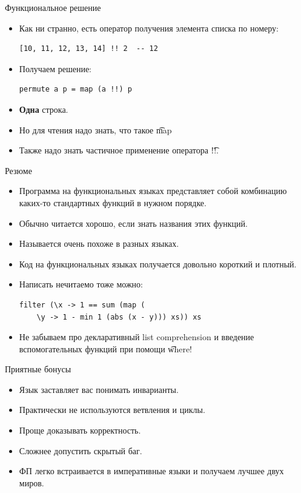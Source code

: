 \begin{frame}[fragile]{Функциональное решение}
	\begin{itemize}
		\item Как ни странно, есть оператор получения элемента списка по номеру:
\begin{verbatim}
[10, 11, 12, 13, 14] !! 2  -- 12
\end{verbatim}
		\item Получаем решение:
\begin{verbatim}
permute a p = map (a !!) p
\end{verbatim}
		\item \textbf{Одна} строка.
		\item Но для чтения надо знать, что такое \t{map}
		\item Также надо знать частичное применение оператора \t{!!}.
	\end{itemize}
\end{frame}

\begin{frame}[fragile]{Резюме}
	\begin{itemize}
		\item Программа на функциональных языках представляет собой комбинацию каких-то стандартных функций в нужном порядке.
		\item Обычно читается хорошо, если знать названия этих функций.
		\item Называется очень похоже в разных языках.
		\item Код на функциональных языках получается довольно короткий и плотный.
		\item Написать нечитаемо тоже можно:
\begin{verbatim}
filter (\x -> 1 == sum (map (
    \y -> 1 - min 1 (abs (x - y))) xs)) xs
\end{verbatim}
		\item Не забываем про декларативный list comprehension и введение вспомогательных функций при помощи \t{where}!
	\end{itemize}
\end{frame}

\begin{frame}{Приятные бонусы}
	\begin{itemize}
		\item Язык заставляет вас понимать инварианты.
		\item Практически не используются ветвления и циклы.
		\item Проще доказывать корректность.
		\item Сложнее допустить скрытый баг.
		\item ФП легко встраивается в императивные языки и получаем лучшее двух миров.
	\end{itemize}
\end{frame}

